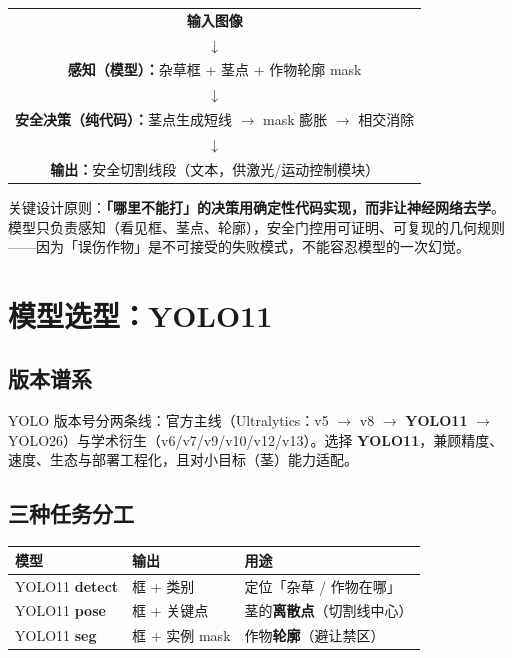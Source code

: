\documentclass[11pt,a4paper]{article}
\begin{document}
\begin{center}
\begin{tabular}{c}
\textbf{输入图像}\\
$\downarrow$\\
\textbf{感知（模型）：}杂草框 + 茎点 + 作物轮廓 mask\\
$\downarrow$\\
\textbf{安全决策（纯代码）：}茎点生成短线 $\rightarrow$ mask 膨胀 $\rightarrow$ 相交消除\\
$\downarrow$\\
\textbf{输出：}安全切割线段（文本，供激光/运动控制模块）
\end{tabular}
\end{center}

关键设计原则：\textbf{「哪里不能打」的决策用确定性代码实现，而非让神经网络去学}。模型只负责感知（看见框、茎点、轮廓），安全门控用可证明、可复现的几何规则——因为「误伤作物」是不可接受的失败模式，不能容忍模型的一次幻觉。

\section{模型选型：YOLO11}

\subsection{版本谱系}

YOLO 版本号分两条线：官方主线（Ultralytics：v5 $\to$ v8 $\to$ \textbf{YOLO11} $\to$ YOLO26）与学术衍生（v6/v7/v9/v10/v12/v13）。选择 \textbf{YOLO11}，兼顾精度、速度、生态与部署工程化，且对小目标（茎）能力适配。

\subsection{三种任务分工}

\begin{table}[h]
\centering
\begin{tabular}{lll}
\toprule
\textbf{模型} & \textbf{输出} & \textbf{用途} \\
\midrule
YOLO11 \textbf{detect} & 框 + 类别 & 定位「杂草 / 作物在哪」 \\
YOLO11 \textbf{pose} & 框 + 关键点 & 茎的\textbf{离散点}（切割线中心） \\
YOLO11 \textbf{seg} & 框 + 实例 mask & 作物\textbf{轮廓}（避让禁区） \\
\bottomrule
\end{tabular}
\end{table}
\end{document}

